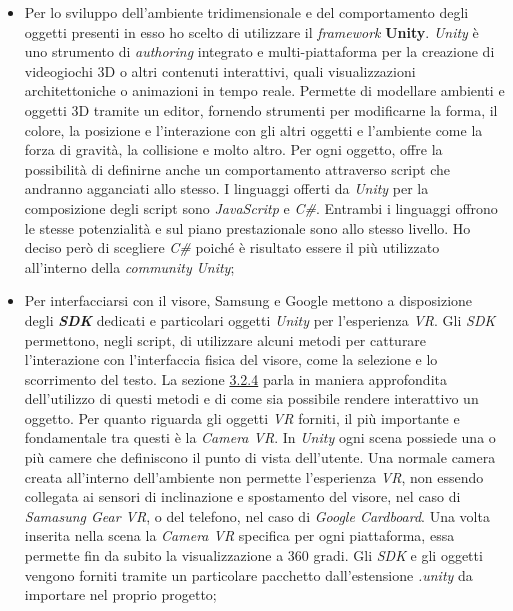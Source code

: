 \begin{itemize}
	\item Per lo sviluppo dell'ambiente tridimensionale e del comportamento degli oggetti presenti in esso ho scelto di utilizzare il \textit{framework} \textbf{Unity}. \textit{Unity} è uno strumento di \textit{authoring} integrato e multi-piattaforma per la creazione di videogiochi 3D o altri contenuti interattivi, quali visualizzazioni architettoniche o animazioni in tempo reale. Permette di modellare ambienti e oggetti 3D tramite un editor, fornendo strumenti per modificarne la forma, il colore, la posizione e l'interazione con gli altri oggetti e l'ambiente come la forza di gravità, la collisione e molto altro. Per ogni oggetto, offre la possibilità di definirne anche un comportamento attraverso script che andranno agganciati allo stesso. I linguaggi offerti da \textit{Unity} per la composizione degli script sono \textit{JavaScritp} e \textit{C\#}. Entrambi i linguaggi offrono le stesse potenzialità e sul piano prestazionale sono allo stesso livello. Ho deciso però di scegliere \textit{C\#} poiché è risultato essere il più utilizzato all'interno della \textit{community} \textit{Unity};

	\item Per interfacciarsi con il visore, Samsung e Google mettono a disposizione degli \textbf{\textit{SDK}} dedicati e particolari oggetti \textit{Unity} per l'esperienza \textit{VR}. Gli \textit{SDK} permettono, negli script, di utilizzare alcuni metodi per catturare l'interazione con l'interfaccia fisica del visore, come la selezione e lo scorrimento del testo. La sezione \hyperlink{3.2.4}{3.2.4} parla in maniera approfondita dell'utilizzo di questi metodi e di come sia possibile rendere interattivo un oggetto. Per quanto riguarda gli oggetti \textit{VR} forniti, il più importante e fondamentale tra questi è la \textit{Camera VR}. In \textit{Unity} ogni scena possiede una o più camere che definiscono il punto di vista dell'utente. Una normale camera creata all'interno dell'ambiente non permette l'esperienza \textit{VR}, non essendo collegata ai sensori di inclinazione e spostamento del visore, nel caso di \textit{Samasung Gear VR}, o del telefono, nel caso di \textit{Google Cardboard}. Una volta inserita nella scena la \textit{Camera VR} specifica per ogni piattaforma, essa permette fin da subito la visualizzazione a 360 gradi. Gli \textit{SDK} e gli oggetti vengono forniti tramite un particolare pacchetto dall'estensione \textit{.unity} da importare nel proprio progetto;


\end{itemize}

